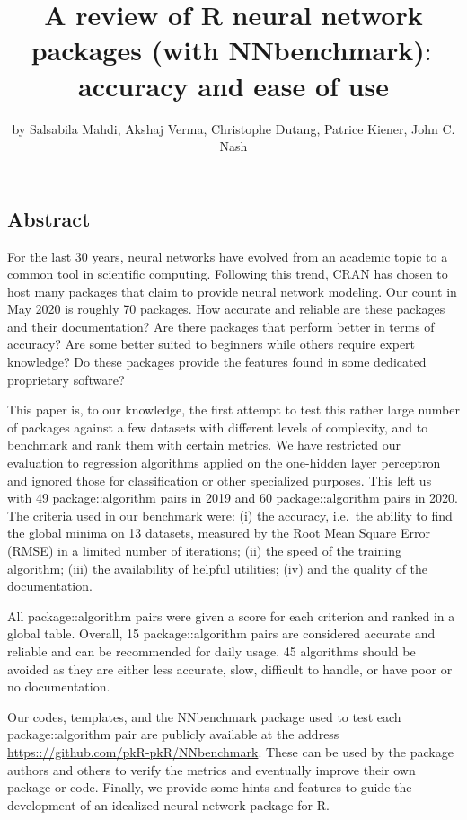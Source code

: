 \title{A review of R neural network packages (with NNbenchmark)\(:\) accuracy
and ease of use}
\author{by Salsabila Mahdi, Akshaj Verma, Christophe Dutang, Patrice Kiener, John C. Nash}

\maketitle


\hypertarget{abstract}{%
\subsection{Abstract}\label{abstract}}

For the last 30 years, neural networks have evolved from an academic
topic to a common tool in scientific computing. Following this trend,
CRAN has chosen to host many packages that claim to provide neural
network modeling. Our count in May 2020 is roughly 70 packages. How
accurate and reliable are these packages and their documentation? Are
there packages that perform better in terms of accuracy? Are some better
suited to beginners while others require expert knowledge? Do these
packages provide the features found in some dedicated proprietary
software?

This paper is, to our knowledge, the first attempt to test this rather
large number of packages against a few datasets with different levels of
complexity, and to benchmark and rank them with certain metrics. We have
restricted our evaluation to regression algorithms applied on the
one-hidden layer perceptron and ignored those for classification or
other specialized purposes. This left us with 49 package::algorithm
pairs in 2019 and 60 package::algorithm pairs in 2020. The criteria used
in our benchmark were: (i) the accuracy, i.e.~the ability to find the
global minima on 13 datasets, measured by the Root Mean Square Error
(RMSE) in a limited number of iterations; (ii) the speed of the training
algorithm; (iii) the availability of helpful utilities; (iv) and the
quality of the documentation.

All package::algorithm pairs were given a score for each criterion and
ranked in a global table. Overall, 15 package::algorithm pairs are
considered accurate and reliable and can be recommended for daily usage.
45 algorithms should be avoided as they are either less accurate, slow,
difficult to handle, or have poor or no documentation.

Our codes, templates, and the NNbenchmark package used to test each
package::algorithm pair are publicly available at the address
\url{https:://github.com/pkR-pkR/NNbenchmark}. These can be used by the
package authors and others to verify the metrics and eventually improve
their own package or code. Finally, we provide some hints and features
to guide the development of an idealized neural network package for R.

